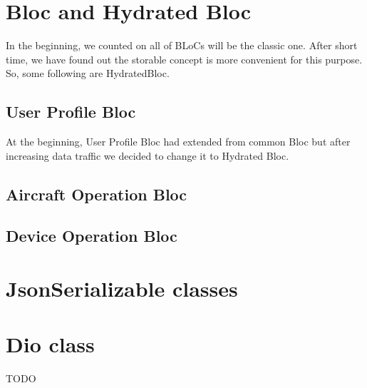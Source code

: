 \section{Bloc and Hydrated Bloc}\label{sec:bloc-and-hydrated-bloc}
In the beginning, we counted on all of BLoCs will be the classic one.
After short time, we have found out the storable concept is more convenient for this purpose.
So, some following are HydratedBloc.

\subsection{User Profile Bloc}\label{subsec:user-profile-bloc}
At the beginning, User Profile Bloc had extended from common Bloc but after increasing data traffic we decided to change it to Hydrated Bloc.


\subsection{Aircraft Operation Bloc}\label{subsec:aircraft-operation-bloc}

\subsection{Device Operation Bloc}\label{subsec:device-operation-bloc}



\section{JsonSerializable classes}\label{sec:jsonserializable-classes}


\section{Dio class}\label{sec:dio-class}

TODO